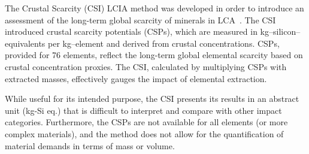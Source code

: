 The Crustal Scarcity (CSI) LCIA method was developed in order to introduce an assessment of the long-term global scarcity of minerals in LCA~\citep{arvidsson2020csi}. The CSI introduced crustal scarcity potentials (CSPs), which are measured in kg--silicon--equivalents per kg--element and derived from crustal concentrations. CSPs, provided for 76 elements, reflect the long-term global elemental scarcity based on crustal concentration proxies. The CSI, calculated by multiplying CSPs with extracted masses, effectively gauges the impact of elemental extraction.

While useful for its intended purpose, the CSI presents its results in an abstract unit (kg-Si eq.) that is difficult to interpret and compare with other impact categories. Furthermore, the CSPs are not available for all elements (or more complex materials), and the method does not allow for the quantification of material demands in terms of mass or volume.